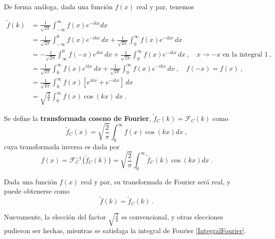 De forma análoga, dada una función $f(x)$ real y par, tenemos

\begin{align*}
    \tilde{f}(k) & = \frac{1}{\sqrt{2\pi}} \int_{-\infty}^{\infty} f(x) e^{-ikx} dx \\
    & = \frac{1}{\sqrt{2\pi}} \int_{-\infty}^0 f(x) e^{-ikx} \,dx + \frac{1}{\sqrt{2\pi}} \int_{0}^{\infty} f(x) e^{-ikx} \, dx  \\
    & = -\frac{1}{\sqrt{2\pi}} \int_{\infty}^0 f(-x) e^{ikx} \,dx + \frac{1}{\sqrt{2\pi}} \int_{0}^{\infty} f(x) e^{-ikx} \, dx \ , \quad x \to -x \mbox{ en la integral 1} \ , \\
    & = \frac{1}{\sqrt{2\pi}} \int_{0}^{\infty} f(x) e^{ikx} \,dx + \frac{1}{\sqrt{2\pi}} \int_{0}^{\infty} f(x) e^{-ikx} \, dx \ , \quad f(-x) = f(x) \ , \\
    & = \frac{1}{\sqrt{2\pi}} \int_{0}^{\infty} f(x) [e^{ikx} + e^{-ikx}  ] \,dx \\
    & = \sqrt{\frac{2}{\pi}} \int_{0}^{\infty} f(x) \cos(kx) \,dx \ .
\end{align*}

\begin{defi}
    Se define la \textbf{transformada coseno de Fourier}, $\tilde{f}_C(k) = \mathcal{F}_C(k)$ como
    \begin{equation}
        \tilde{f}_C(x) = \sqrt{\frac{2}{\pi}} \int_0^\infty f(x) \cos(kx) dx \ ,
    \end{equation}
    cuya transformada inversa es dada por
    \begin{equation}
        f(x) = \mathcal{F}^{-1}_C\{\tilde{f}_C(k)\} = \sqrt{\frac{2}{\pi}} \int_0^\infty \tilde{f}_C(k) \cos(kx) dx \ .
    \end{equation}

    Dada una función $f(x)$ real y par, su transformada de Fourier será real, y puede obtenerse como
    \begin{equation*}
        \tilde{f}(k) = \tilde{f}_C(k) \ .
    \end{equation*}
\end{defi}

Nuevamente, la elección del factor $\sqrt{\frac{2}{\pi}}$ es convencional, y otras elecciones pudieron ser hechas, mientras se satisfaga la integral de Fourier \eqref{IntegralFourier}.


